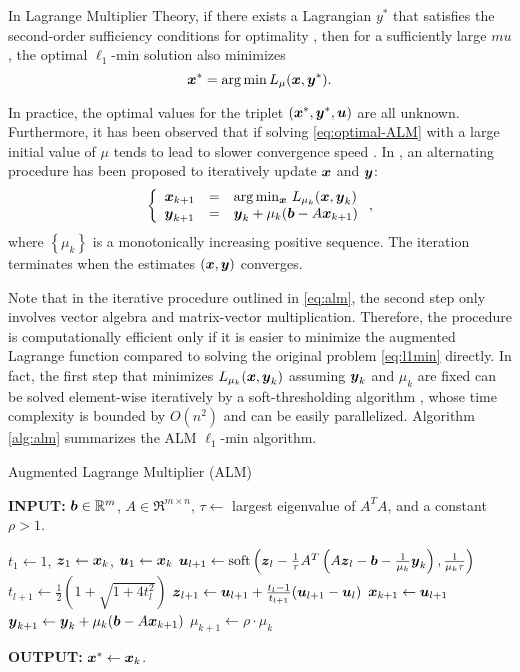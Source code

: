 \documentclass[10pt,twocolumn,letterpaper]{article}
\begin{document}
In Lagrange Multiplier Theory, if there exists a Lagrangian $y^*$ that
satisfies the second-order sufficiency conditions for optimality
\cite{BertsekasD2003}, then for a sufficiently large $mu$, the optimal
$\ell_1$-min solution also minimizes
\begin{equation}
{\boldsymbol{x}}^* = \arg \min L_\mu({\boldsymbol{x}},{\boldsymbol{y}}^*).
\label{eq:optimal-ALM}
\end{equation}

In practice, the optimal values for the triplet $({\boldsymbol{x}}^*, {\boldsymbol{y}}^*, {\boldsymbol{u}})$ are all
unknown. Furthermore, it has been observed that if solving
\eqref{eq:optimal-ALM} with a large initial value of $\mu$ tends to lead to
slower convergence speed \cite{WrightS2008,YangA2010-ICIP}. In
\cite{BertsekasD2003,YangJ2009}, an alternating procedure has been proposed to
iteratively update ${\boldsymbol{x}}$ and ${\boldsymbol{y}}$:
\begin{equation}
\left \{
\begin{array}{lll}
{\boldsymbol{x}}_{k+1} & = & \arg\min_{{\boldsymbol{x}}} \, L_{\mu_k} ({\boldsymbol{x}},{\boldsymbol{y}}_k)\\
{\boldsymbol{y}}_{k+1} & = & {\boldsymbol{y}}_k + \mu_k ({\boldsymbol{b}} - A{\boldsymbol{x}}_{k+1}) \\
\end{array}
\right . ,
\label{eq:alm}
\end{equation}
where $\left\{\mu_{k}\right\}$ is a monotonically increasing positive sequence.
The iteration terminates when the estimates $({\boldsymbol{x}}, {\boldsymbol{y}})$ converges.

Note that in the iterative procedure outlined in \eqref{eq:alm}, the second
step only involves vector algebra and matrix-vector multiplication. Therefore,
the procedure is computationally efficient only if it is easier to minimize the
augmented Lagrange function compared to solving the original problem
\eqref{eq:l1min} directly. In fact, the first step that minimizes $L_{\mu_k}
({\boldsymbol{x}},{\boldsymbol{y}}_k)$ assuming ${\boldsymbol{y}}_k$ and $\mu_k$ are fixed can be solved element-wise
iteratively by a soft-thresholding algorithm \cite{WrightS2008,BeckA2009},
whose time complexity is bounded by $O(n^2)$ and can be easily parallelized.
Algorithm \ref{alg:alm} summarizes the ALM $\ell_1$-min algorithm.

 \begin{algorithm}[h]
\caption{Augmented Lagrange Multiplier (ALM)}
{\bf INPUT:} ${\boldsymbol{b}} \in {\mathbb{R}}^m$, $A \in \Re^{m \times n}$, $\tau\leftarrow$ largest eigenvalue of $A^TA$, and a constant $\rho>1$.
\begin{algorithmic}[1]
 \STATE $t_1 \leftarrow 1$, ${\boldsymbol{z}}_1
\leftarrow {\boldsymbol{x}}_k$, ${\boldsymbol{u}}_1 \leftarrow {\boldsymbol{x}}_k$  \STATE ${\boldsymbol{u}}_{l+1}  \leftarrow
\mathrm{soft}\left({\boldsymbol{z}}_l - \frac{1}{\tau}A^T\left(A{\boldsymbol{z}}_l - {\boldsymbol{b}}
- \frac{1}{\mu_k}{\boldsymbol{y}}_k\right), \frac{1}{\mu_k\tau}\right)$
\STATE $t_{l+1} \leftarrow \frac{1}{2}\left( 1 +
\sqrt{1+4t_l^2}\right)$ \STATE ${\boldsymbol{z}}_{l+1} \leftarrow {\boldsymbol{u}}_{l+1}
+ \frac{t_l - 1}{t_{l+1}}({\boldsymbol{u}}_{l+1} - {\boldsymbol{u}}_l)$ \ENDWHILE \STATE$
{\boldsymbol{x}}_{k+1} \leftarrow {\boldsymbol{u}}_{l+1}$ \STATE ${\boldsymbol{y}}_{k+1} \leftarrow
{\boldsymbol{y}}_k + \mu_k ({\boldsymbol{b}} - A{\boldsymbol{x}}_{k+1})$ \STATE $\mu_{k+1} \leftarrow
\rho\cdot\mu_k$ \ENDWHILE 
\end{algorithmic}

{\bf OUTPUT:} ${\boldsymbol{x}}^* \leftarrow {\boldsymbol{x}}_k$.
\label{alg:alm}
\end{algorithm}
\end{document}
